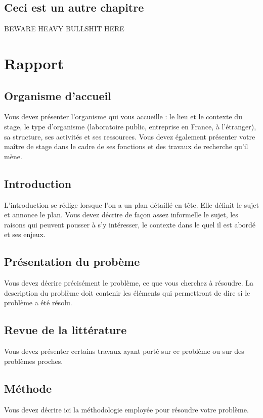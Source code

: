 \documentclass[twoside,10pt,openany,a4paper]{rapport}
\begin{document}
  \chapter{Ceci est un autre chapitre}
  BEWARE HEAVY BULLSHIT HERE\\

  \part{Rapport}
  \chapter{Organisme d'accueil}
  Vous devez présenter l’organisme qui vous accueille : le lieu et le contexte du stage, le type d’organisme (laboratoire public, entreprise en France, à l’étranger), sa structure, ses activités et ses ressources. Vous devez également présenter votre maître de stage dans le cadre de ses fonctions et des travaux de recherche qu’il mène.

  \chapter{Introduction}
  L’introduction se rédige lorsque l’on a un plan détaillé en tête. Elle définit le sujet et annonce le plan.
  Vous devez décrire de façon assez informelle le sujet, les raisons qui peuvent pousser à s’y intéresser, le contexte dans le quel il est abordé et ses enjeux.

  \chapter{Présentation du probème}
  Vous devez décrire précisément le problème, ce que vous cherchez à résoudre. La description du problème doit contenir les éléments qui permettront de dire si le problème a été résolu.

  \chapter{Revue de la littérature}
  Vous devez présenter certains travaux ayant porté sur ce problème ou sur des problèmes proches.


  \chapter{Méthode}
  Vous devez décrire ici la méthodologie employée pour résoudre votre problème. 
\end{document}
